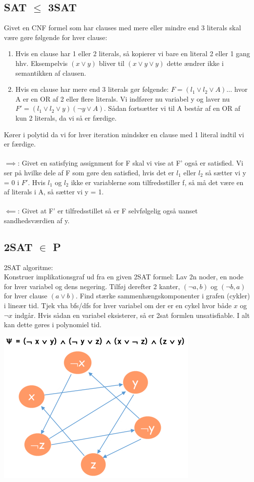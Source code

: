 \documentclass{article}
\begin{document}
\subsection{SAT $\le$ 3SAT}
Givet en CNF formel som har clauses med mere eller mindre end 3 literals skal være gøre følgende for hver clause:\\
\begin{enumerate}
    \item Hvis en clause har 1 eller 2 literals, så kopierer vi bare en literal 2 eller 1 gang hhv. Eksempelvis $(x\lor y)$ bliver til $(x \lor y \lor y)$ dette ændrer ikke i semantikken af clausen.
    \item Hvis en clause har mere end 3 literals gør følgende: $ F = (l_1 \lor l_2 \lor A)...$ hvor A er en OR af 2 eller flere literals. Vi indfører nu variabel y og laver nu $F' = (l_1 \lor l_2 \lor y) (\lnot y \lor A)$. Sådan fortsætter vi til A består af en OR af kun  2 literals, da vi så er færdige.
\end{enumerate}
Kører i polytid da vi for hver iteration mindsker en clause med 1 literal indtil vi er færdige. \\\\
$\implies$: Givet en satisfying assignment for F skal vi vise at F' også er satisfied. Vi ser på hvilke dele af F som gøre den satisfied, hvis det er $l_1$ eller $l_2$ så sætter vi y = 0 i $F'$. Hvis $l_1$ og $l_2$ ikke er variablerne som tilfredsstiller f, så må det være en af literals i A, så sætter vi y = 1.\\\\
$\impliedby$: Givet at F' er tilfredsstillet så er F selvfølgelig også uanset sandhedsværdien af y.
\subsection{2SAT $\in$ P}
2SAT algoritme:\\
Konstruer implikationsgraf ud fra en given 2SAT formel: Lav 2n noder, en node for hver variabel og dens negering. Tilføj derefter 2 kanter, $(\lnot a, b)$ og $(\lnot b,a)$ for hver clause $(a \lor b)$. Find stærke sammenhængskomponenter i grafen (cykler) i lineær tid. Tjek vha bfs/dfs for hver variabel om der er en cykel hvor både $x$ og $\lnot x$ indgår. Hvis sådan en variabel eksisterer, så er 2sat formlen unsatisfiable. I alt kan dette gøres i polynomiel tid.
\begin{center}
    \includegraphics[scale=0.7]{2sat2}
\end{center}
\end{document}

